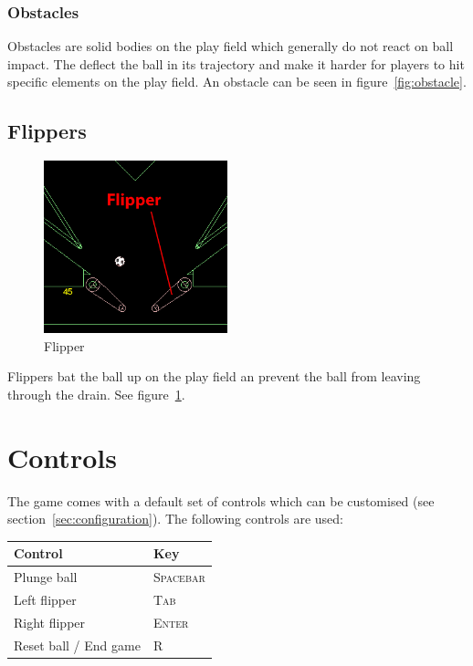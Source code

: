 \documentclass[fontsize=12pt,
               paper=a4,
               twoside=false,
               parskip=half,
               ]{scrartcl}
\begin{document}
\subsubsection{Obstacles}

Obstacles are solid bodies on the play field which generally do not react on ball impact. The deflect the ball in its trajectory and make it harder for players to hit specific elements on the play field. An obstacle can be seen in figure~\ref{fig:obstacle}.

\subsection{Flippers}

\begin{figure}
	\centering
	\includegraphics[height=5cm]{./img/manual/flipper.png}
	\caption[Flipper]{Flipper}
	\label{fig:flipper}
\end{figure}

Flippers bat the ball up on the play field an prevent the ball from leaving through the drain. See figure~\ref{fig:flipper}.

\section{Controls}

The game comes with a default set of controls which can be customised (see section~\ref{sec:configuration}). The following controls are used:

\begin{tabular}{ | l | l | }
\hline
\textbf{Control} & \textbf{Key} \\ \hline
Plunge ball & \textsc{Spacebar}  \\ \hline
Left flipper & \textsc{Tab}  \\ \hline
Right flipper & \textsc{Enter}  \\ \hline
Reset ball / End game & \textsc{R}  \\ \hline

\end{tabular}
\end{document}
